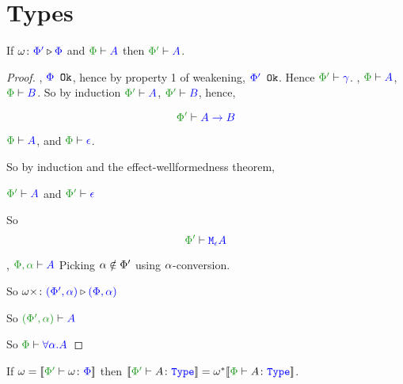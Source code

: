 \documentclass{report}
\begin{document}
\section{Types}

\begin{theorem}
        If $\omega \colon {\color{blue}\Phi'} \triangleright {\color {blue} \Phi}$ and $\wellformed{\P}{A}$ then $\wellformed{\P'}{A}$.
    
\end{theorem}


\begin{framed}
    \begin{proof}
            \bi, ${\color{blue} \Phi} \texttt{ Ok}$, hence by property 1 of weakening, ${\color{blue} \Phi'} \texttt{ Ok}$. Hence $\wellformed{\P'}{\g}$.
            \bi, $\wellformed{\P}{A}$, $\wellformed{\P}{B}$.
            So by induction $\wellformed{\P'}{A}$, $\wellformed{\P'}{B}$, hence,
        
            $$\wellformed{\P'}{\ab}$$
        
        
            \bi $\wellformed{\P}{A}$, and $\wellformed{\P}{\e}$.
        
            So by induction and the effect-wellformedness theorem, 
        
            $\wellformed{\P'}{A}$ and $\wellformed{\P'}{\e}$
        
            So $$\wellformed{\P'}{\mea}$$
        
            \bi, $\wellformed{\P,\a}{A}$
            Picking $\alpha\notin\Phi'$ using $\alpha$-conversion.
        
            So $\omega\times \colon {\color{blue}(\Phi', \alpha)} \triangleright {\color {blue} (\Phi, \alpha)}$
        
            So $\wellformed{(\P', \a)}{A}$
        
            So $\wellformed{\P}{\all{\a}{A}}$
        
        
    \end{proof}
        
\end{framed}

\begin{theorem}
    If $\w = \deno{\typerelation{\P'}{\w}{\P}}$ then $\deno{\typerelation{\P'}{A}{\type}} = \w\star\deno{\typerelation{\P}{A}{\type}}$.
\end{theorem}
\end{document}
